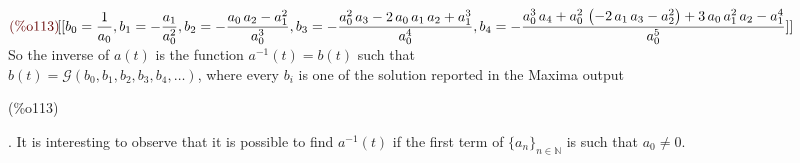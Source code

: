 \begin{math}\displaystyle
  \parbox{8ex}{\color{labelcolor}(\%o113) }
  [[{b}_{0}=\frac{1}{{a}_{0}},{b}_{1}=-\frac{{a}_{1}}{{a}_{0}^{2}},{b}_{2}=-\frac{{a}_{0}\,{a}_{2}-{a}_{1}^{2}}{{a}_{0}^{3}},{b}_{3}=-\frac{{a}_{0}^{2}\,{a}_{3}-2\,{a}_{0}\,{a}_{1}\,{a}_{2}+{a}_{1}^{3}}{{a}_{0}^{4}},\\
  {b}_{4}=-\frac{{a}_{0}^{3}\,{a}_{4}+{a}_{0}^{2}\,\left(
      -2\,{a}_{1}\,{a}_{3}-{a}_{2}^{2}\right)
    +3\,{a}_{0}\,{a}_{1}^{2}\,{a}_{2}-{a}_{1}^{4}}{{a}_{0}^{5}}]]
\end{math}\\
So the inverse of $a(t)$ is the function $a^{-1}(t)= b(t)$ such that\\
$b(t)= \mathcal{G} (b_0, b_1, b_2, b_3, b_4, \ldots )$, where every
$b_i$ is one of the solution reported in the Maxima
output \parbox{8ex}{\color{labelcolor}(\%o113) }. It is interesting to
observe that it is possible to find $a^{-1}(t)$ if the first term of
$\{a_n\}_{n\in\mathbb{N} } $ is such that $a_0 \not = 0$.

